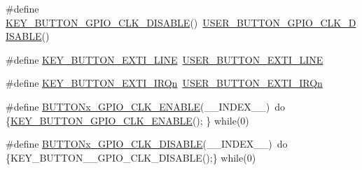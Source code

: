 \begin{DoxyCompactItemize}
\item 
\#define \hyperlink{group__B-L072Z-LRWAN1__LOW__LEVEL__BUTTON_gacf1a6a3b79ec610401d7ffbc1b6115d4}{K\+E\+Y\+\_\+\+B\+U\+T\+T\+O\+N\+\_\+\+G\+P\+I\+O\+\_\+\+C\+L\+K\+\_\+\+D\+I\+S\+A\+B\+LE}()~\hyperlink{group__B-L072Z-LRWAN1__LOW__LEVEL__BUTTON_ga71af1d1eec8f8b424b72f625abaad282}{U\+S\+E\+R\+\_\+\+B\+U\+T\+T\+O\+N\+\_\+\+G\+P\+I\+O\+\_\+\+C\+L\+K\+\_\+\+D\+I\+S\+A\+B\+LE}()
\item 
\#define \hyperlink{group__B-L072Z-LRWAN1__LOW__LEVEL__BUTTON_gae22d60d9f89ae7203bcd5ca8146bcef0}{K\+E\+Y\+\_\+\+B\+U\+T\+T\+O\+N\+\_\+\+E\+X\+T\+I\+\_\+\+L\+I\+NE}~\hyperlink{group__B-L072Z-LRWAN1__LOW__LEVEL__BUTTON_gac41d04c2244ba780e4749991c85d1e9a}{U\+S\+E\+R\+\_\+\+B\+U\+T\+T\+O\+N\+\_\+\+E\+X\+T\+I\+\_\+\+L\+I\+NE}
\item 
\#define \hyperlink{group__B-L072Z-LRWAN1__LOW__LEVEL__BUTTON_gaeb5bffe8281b0754675cfdfb2847e82d}{K\+E\+Y\+\_\+\+B\+U\+T\+T\+O\+N\+\_\+\+E\+X\+T\+I\+\_\+\+I\+R\+Qn}~\hyperlink{group__B-L072Z-LRWAN1__LOW__LEVEL__BUTTON_ga2e6e65a053529869d1c370610825d98f}{U\+S\+E\+R\+\_\+\+B\+U\+T\+T\+O\+N\+\_\+\+E\+X\+T\+I\+\_\+\+I\+R\+Qn}
\item 
\#define \hyperlink{group__B-L072Z-LRWAN1__LOW__LEVEL__BUTTON_gaa397abaece51f4d7aafb07fd79640f3e}{B\+U\+T\+T\+O\+Nx\+\_\+\+G\+P\+I\+O\+\_\+\+C\+L\+K\+\_\+\+E\+N\+A\+B\+LE}(\+\_\+\+\_\+\+I\+N\+D\+E\+X\+\_\+\+\_\+)~do \{\hyperlink{group__B-L072Z-LRWAN1__LOW__LEVEL__BUTTON_ga6237d656da42b750f63cbf3e329096d5}{K\+E\+Y\+\_\+\+B\+U\+T\+T\+O\+N\+\_\+\+G\+P\+I\+O\+\_\+\+C\+L\+K\+\_\+\+E\+N\+A\+B\+LE}();  \} while(0)
\item 
\#define \hyperlink{group__B-L072Z-LRWAN1__LOW__LEVEL__BUTTON_gaf44f31971ce49524d0243b8e37048b8f}{B\+U\+T\+T\+O\+Nx\+\_\+\+G\+P\+I\+O\+\_\+\+C\+L\+K\+\_\+\+D\+I\+S\+A\+B\+LE}(\+\_\+\+\_\+\+I\+N\+D\+E\+X\+\_\+\+\_\+)~do \{K\+E\+Y\+\_\+\+B\+U\+T\+T\+O\+N\+\_\+\+\_\+\+G\+P\+I\+O\+\_\+\+C\+L\+K\+\_\+\+D\+I\+S\+A\+B\+LE();\} while(0)
\end{DoxyCompactItemize}
